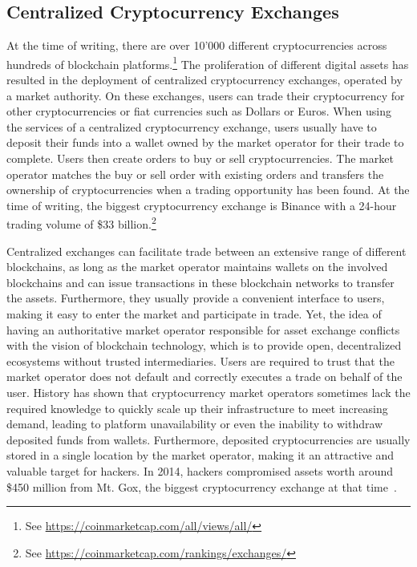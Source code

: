 \subsection{Centralized Cryptocurrency Exchanges}
At the time of writing, there are over 10'000 different cryptocurrencies across hundreds of blockchain platforms.\footnote{See \url{https://coinmarketcap.com/all/views/all/}}
The proliferation of different digital assets has resulted in the deployment of centralized cryptocurrency exchanges, operated by a market authority.
On these exchanges, users can trade their cryptocurrency for other cryptocurrencies or fiat currencies such as Dollars or Euros.
When using the services of a centralized cryptocurrency exchange, users usually have to deposit their funds into a wallet owned by the market operator for their trade to complete.
Users then create orders to buy or sell cryptocurrencies.
The market operator matches the buy or sell order with existing orders and transfers the ownership of cryptocurrencies when a trading opportunity has been found.
At the time of writing, the biggest cryptocurrency exchange is Binance with a 24-hour trading volume of \$33 billion.\footnote{See \url{https://coinmarketcap.com/rankings/exchanges/}}

Centralized exchanges can facilitate trade between an extensive range of different blockchains, as long as the market operator maintains wallets on the involved blockchains and can issue transactions in these blockchain networks to transfer the assets.
Furthermore, they usually provide a convenient interface to users, making it easy to enter the market and participate in trade.
Yet, the idea of having an authoritative market operator responsible for asset exchange conflicts with the vision of blockchain technology, which is to provide open, decentralized ecosystems without trusted intermediaries.
Users are required to trust that the market operator does not default and correctly executes a trade on behalf of the user.
History has shown that cryptocurrency market operators sometimes lack the required knowledge to quickly scale up their infrastructure to meet increasing demand, leading to platform unavailability or even the inability to withdraw deposited funds from wallets.
Furthermore, deposited cryptocurrencies are usually stored in a single location by the market operator, making it an attractive and valuable target for hackers.
In 2014, hackers compromised assets worth around \$450 million from Mt. Gox, the biggest cryptocurrency exchange at that time~\cite{trautman2014virtual}.

